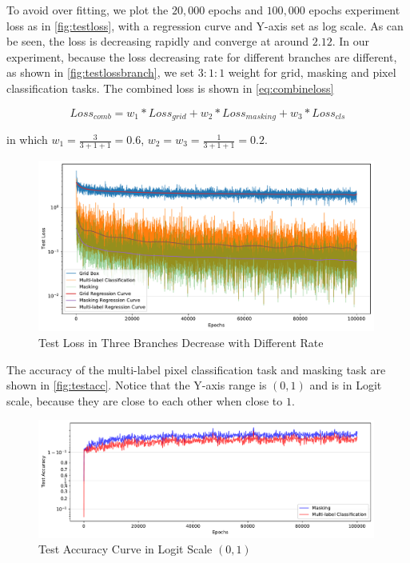 \begin{spacing}{1.5}
To avoid over fitting, we plot the $20,000$ epochs and $100,000$ epochs experiment loss as in \autoref{fig:testloss}, with a regression curve and Y-axis set as log scale. As can be seen, the loss is decreasing rapidly and converge at around $2.12$. In our experiment, because the loss decreasing rate for different branches are different, as shown in \autoref{fig:testlossbranch}, we set $3:1:1$ weight for grid, masking and pixel classification tasks. The combined loss is shown in \autoref{eq:combineloss}

\begin{equation}
\label{eq:combineloss}
    Loss_{comb}=w_1*{Loss_{grid}}+w_2*{Loss_{masking}}+w_3*{Loss_{cls}}
\end{equation}

in which $w_1=\frac{3}{3+1+1}=0.6$, $w_2=w_3=\frac{1}{3+1+1}=0.2$.

\begin{figure}[ht]
\centering
\includegraphics[width=0.99\textwidth, fbox]{Chapter5/testlossbranch.pdf}
\caption{Test Loss in Three Branches Decrease with Different Rate}
\label{fig:testlossbranch} 
\end{figure}

The accuracy of the multi-label pixel classification task and masking task are shown in \autoref{fig:testacc}. Notice that the Y-axis range is $(0,1)$ and is in Logit scale, because they are close to each other when close to $1$.

\begin{figure}[ht]
\centering
\includegraphics[width=0.99\textwidth, fbox]{Chapter5/testacc.pdf}
\caption{Test Accuracy Curve in Logit Scale $(0,1)$}
\label{fig:testacc} 
\end{figure}


\end{spacing}
